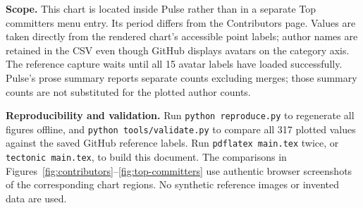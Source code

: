 \documentclass[11pt,a4paper]{article}
\begin{document}
\medskip\noindent\textbf{Scope.}
This chart is located inside Pulse rather than in a separate Top committers
menu entry. Its period differs from the Contributors page. Values are taken
directly from the rendered chart's accessible point labels; author names are
retained in the CSV even though GitHub displays avatars on the category axis.
The reference capture waits until all 15 avatar labels have loaded successfully.
Pulse's prose summary reports separate counts excluding merges; those summary
counts are not substituted for the plotted author counts.

\medskip\noindent\textbf{Reproducibility and validation.}
Run \texttt{python reproduce.py} to regenerate all figures offline, and
\texttt{python tools/validate.py} to compare all 317 plotted values against
the saved GitHub reference labels. Run \texttt{pdflatex main.tex} twice, or
\texttt{tectonic main.tex}, to build this document. The comparisons in
Figures~\ref{fig:contributors}--\ref{fig:top-committers} use authentic browser
screenshots of the corresponding chart regions. No synthetic reference images
or invented data are used.
\end{document}
